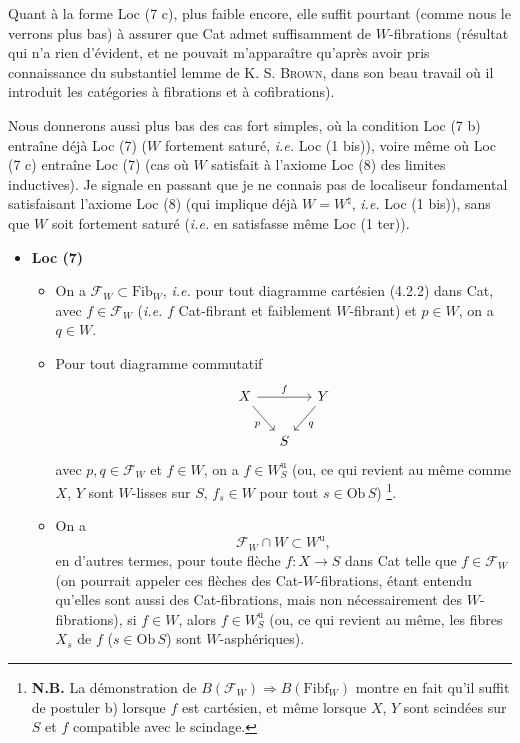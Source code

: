 \documentclass[11pt]{article}
\newcommand{\msp}[1]{\marginpar{\footnotesize [#1]}}
\newcommand{\Fib}{\mathrm{Fib}}
\newcommand{\Fibf}{\mathrm{Fibf}}
\begin{document}
Quant à la forme Loc (7 c), plus faible encore, elle suffit pourtant (comme nous le verrons plus bas) à assurer que Cat admet suffisamment de $W$-fibrations \msp{page 38} (résultat qui n'a rien d'évident, et ne pouvait m'apparaître qu'après avoir pris connaissance du substantiel lemme de K. S. \textsc{Brown}, dans son beau travail où il introduit les catégories à fibrations et à cofibrations).

Nous donnerons aussi plus bas des cas fort simples, où la condition Loc (7 b) entraîne déjà Loc (7) ($W$ fortement saturé, \textit{i.e.} Loc (1 bis)), voire même où Loc (7 c) entraîne Loc (7) (cas où $W$ satisfait à l'axiome Loc (8) des limites inductives). Je signale en passant que je ne connais pas de localiseur fondamental satisfaisant l'axiome Loc (8) (qui implique déjà $W = W^{\natural}$, \textit{i.e.} Loc (1 bis)), sans que $W$ soit fortement saturé (\textit{i.e.} en satisfasse même Loc (1 ter)).

\begin{itemize}[label={},leftmargin=0.6cm]
\item \textbf{Loc (7)}
\begin{itemize}[leftmargin=1.2cm]
\item[a)] On a $\mathcal{F}_W \subset \Fib_W$, \textit{i.e.} pour tout diagramme cartésien (4.2.2) dans Cat, avec $f \in \mathcal{F}_W$ (\textit{i.e.} $f$ Cat-fibrant et faiblement $W$-fibrant) et $p \in W$, on a $q \in W$.
\item[b)] Pour tout diagramme commutatif
\[
\begin{tikzcd}[column sep=small]
X \arrow[rr, "f"] \arrow[dr, "p"'] & & Y \arrow[dl, "q"] \\
 & S &
\end{tikzcd}
\]
\msp{page 39}
avec $p, q \in \mathcal{F}_W$ et $f \in W$, on a $f \in W_S^{\mathrm{u}}$ (ou, ce qui revient au même comme $X$, $Y$ sont $W$-lisses sur $S$, $f_s \in W$ pour tout $s \in \mathrm{Ob}\, S$) \footnote[25]{\textbf{N.B.} La démonstration de $B(\mathcal{F}_W) \Longrightarrow B(\Fibf_W)$ montre en fait qu'il suffit de postuler b) lorsque $f$ est cartésien, et même lorsque $X$, $Y$ sont scindées sur $S$ et $f$ compatible avec le scindage.}.
\item[c)] On a
\[
\mathcal{F}_W \cap W \subset W^{\mathrm{u}},
\]
en d'autres termes, pour toute flèche $f : X \longrightarrow S$ dans Cat telle que $f \in \mathcal{F}_W$ (on pourrait appeler ces flèches des Cat-$W$-fibrations, étant entendu qu'elles sont aussi des Cat-fibrations, mais non nécessairement des $W$-fibrations), si $f \in W$, alors $f \in W_S^{\mathrm{u}}$ (ou, ce qui revient au même, les fibres $X_s$ de $f$ ($s \in \mathrm{Ob}\, S$) sont $W$-asphériques).
\end{itemize}
\end{itemize}
\end{document}
